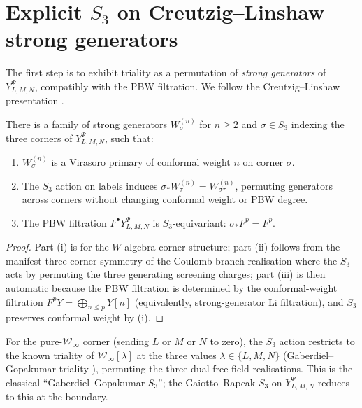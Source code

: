 \section{Explicit $S_3$ on Creutzig--Linshaw strong generators}
\label{sec:triality-strong-generators}

The first step is to exhibit triality as a permutation of
\emph{strong generators} of $Y_{L,M,N}^\Psi$, compatibly with the PBW
filtration. We follow the Creutzig--Linshaw presentation
\cite{CreutzigLinshaw2019}.

\begin{proposition}
\label{prop:strong-generators-s3}
There is a family of strong generators $W^{(n)}_{\sigma}$ for
$n \ge 2$ and $\sigma \in S_3$ indexing the three corners of
$Y_{L,M,N}^\Psi$, such that:
\begin{enumerate}
\item[(i)] $W^{(n)}_{\sigma}$ is a Virasoro primary of conformal
 weight $n$ on corner $\sigma$.
\item[(ii)] The $S_3$ action on labels induces
 $\sigma_* W^{(n)}_{\tau} = W^{(n)}_{\sigma\tau}$, permuting generators
 across corners without changing conformal weight or PBW degree.
\item[(iii)] The PBW filtration $F^\bullet Y_{L,M,N}^\Psi$ is
 $S_3$-equivariant: $\sigma_* F^p = F^p$.
\end{enumerate}
\end{proposition}

\begin{proof}
Part (i) is \cite[Thm.~3.4]{CreutzigLinshaw2019} for the
$W$-algebra corner structure; part (ii) follows from the manifest
three-corner symmetry of the Coulomb-branch realisation
\cite[\S4]{ProchazkRapcak2018} where the $S_3$ acts by permuting
the three generating screening charges; part (iii) is then
automatic because the PBW filtration is determined by the
conformal-weight filtration
$F^p Y = \bigoplus_{n \le p} Y[n]$ (equivalently, strong-generator
Li filtration), and $S_3$ preserves conformal weight by (i).
\end{proof}

\begin{remark}
\label{rem:wn-explicit-triality}
For the pure-$\mathcal{W}_\infty$ corner (sending $L$ or $M$ or $N$
to zero), the $S_3$ action restricts to the known triality of
$\mathcal{W}_\infty[\lambda]$ at the three values
$\lambda \in \{L, M, N\}$ (Gaberdiel--Gopakumar triality
\cite{GaberdielGopakumar2012}), permuting the three dual free-field
realisations. This is the classical ``Gaberdiel--Gopakumar $S_3$'';
the Gaiotto--Rapcak $S_3$ on $Y_{L,M,N}^\Psi$ reduces to this at the
boundary.
\end{remark}


